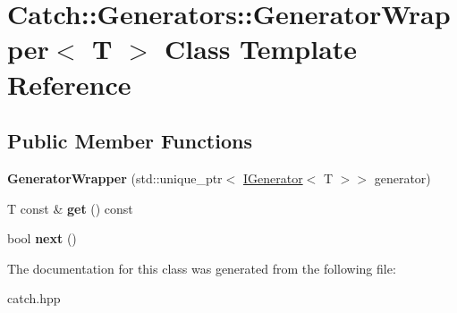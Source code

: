 \hypertarget{classCatch_1_1Generators_1_1GeneratorWrapper}{}\section{Catch\+::Generators\+::Generator\+Wrapper$<$ T $>$ Class Template Reference}
\label{classCatch_1_1Generators_1_1GeneratorWrapper}
\subsection*{Public Member Functions}
\begin{DoxyCompactItemize}
\item 
\mbox{\label{classCatch_1_1Generators_1_1GeneratorWrapper_aecffeafd4fd38d91a52dadf28b6e2b29}} 
{\bfseries Generator\+Wrapper} (std\+::unique\+\_\+ptr$<$ \mbox{\hyperlink{structCatch_1_1Generators_1_1IGenerator}{I\+Generator}}$<$ T $>$$>$ generator)
\item 
\mbox{\label{classCatch_1_1Generators_1_1GeneratorWrapper_a271f0f905f2c473c907550435b81e102}} 
T const  \& {\bfseries get} () const
\item 
\mbox{\label{classCatch_1_1Generators_1_1GeneratorWrapper_acbfdca94811ae02461bd2cf5f60b666e}} 
bool {\bfseries next} ()
\end{DoxyCompactItemize}


The documentation for this class was generated from the following file\+:\begin{DoxyCompactItemize}
\item 
catch.\+hpp\end{DoxyCompactItemize}
